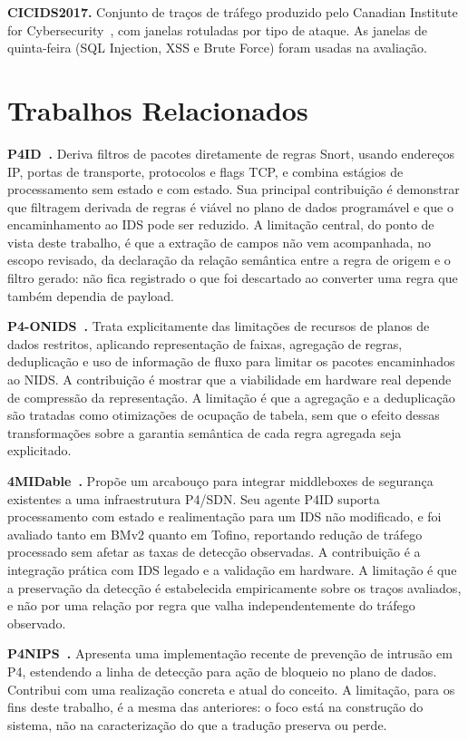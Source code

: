 \documentclass[11pt,a4paper]{article}
\begin{document}
\textbf{CICIDS2017.} Conjunto de traços de tráfego produzido pelo Canadian
Institute for Cybersecurity~\cite{sharafaldin2018cicids}, com janelas
rotuladas por tipo de ataque. As janelas de quinta-feira (SQL Injection, XSS e
Brute Force) foram usadas na avaliação.

\section{Trabalhos Relacionados}

\textbf{P4ID~\cite{lewis2019p4id}.} Deriva filtros de pacotes diretamente de
regras Snort, usando endereços IP, portas de transporte, protocolos e flags
TCP, e combina estágios de processamento sem estado e com estado. Sua
principal contribuição é demonstrar que filtragem derivada de regras é viável
no plano de dados programável e que o encaminhamento ao IDS pode ser reduzido.
A limitação central, do ponto de vista deste trabalho, é que a extração de
campos não vem acompanhada, no escopo revisado, da declaração da relação
semântica entre a regra de origem e o filtro gerado: não fica registrado o que
foi descartado ao converter uma regra que também dependia de payload.

\textbf{P4-ONIDS~\cite{tavares2021p4onids}.} Trata explicitamente das
limitações de recursos de planos de dados restritos, aplicando representação
de faixas, agregação de regras, deduplicação e uso de informação de fluxo para
limitar os pacotes encaminhados ao NIDS. A contribuição é mostrar que a
viabilidade em hardware real depende de compressão da representação. A
limitação é que a agregação e a deduplicação são tratadas como otimizações de
ocupação de tabela, sem que o efeito dessas transformações sobre a garantia
semântica de cada regra agregada seja explicitado.

\textbf{4MIDable~\cite{lewis2023fourmidable}.} Propõe um arcabouço para
integrar middleboxes de segurança existentes a uma infraestrutura P4/SDN. Seu
agente P4ID suporta processamento com estado e realimentação para um IDS não
modificado, e foi avaliado tanto em BMv2 quanto em Tofino, reportando redução
de tráfego processado sem afetar as taxas de detecção observadas. A
contribuição é a integração prática com IDS legado e a validação em hardware.
A limitação é que a preservação da detecção é estabelecida empiricamente sobre
os traços avaliados, e não por uma relação por regra que valha
independentemente do tráfego observado.

\textbf{P4NIPS~\cite{senoski2025p4nips}.} Apresenta uma implementação recente
de prevenção de intrusão em P4, estendendo a linha de detecção para ação de
bloqueio no plano de dados. Contribui com uma realização concreta e atual do
conceito. A limitação, para os fins deste trabalho, é a mesma das anteriores:
o foco está na construção do sistema, não na caracterização do que a tradução
preserva ou perde.
\end{document}
